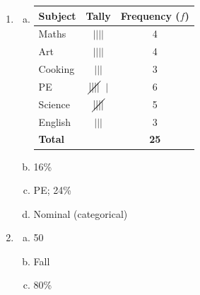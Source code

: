 \documentclass{article}
\newcommand{\tallyV}{$\cancel{||||}$}
\begin{document}
\begin{enumerate}
\item 
\begin{enumerate}[(a)]
  \item \phantom{x}
  \begin{center}
  \renewcommand{\arraystretch}{1.4}
  \begin{tabular}{lcc}
    \toprule
    \textbf{Subject} & \textbf{Tally} & \textbf{Frequency ($f$)} \\
    \midrule
    Maths   & $||||$           & 4  \\
    Art     & $||||$           & 4  \\
    Cooking & $|||$            & 3  \\
    PE      & \tallyV\ $|$     & 6  \\
    Science & \tallyV          & 5  \\
    English & $|||$            & 3  \\
    \midrule
    \textbf{Total} & & \textbf{25} \\
    \bottomrule
  \end{tabular}
  \end{center}
 
 
  \item 16\%
  \item PE; 24\%
  \item Nominal (categorical)
\end{enumerate}
 
\item 
\begin{enumerate}[(a)]
  \item 50
  \item Fall
  \item 80\%
\end{enumerate}
\end{enumerate}
\end{document}
